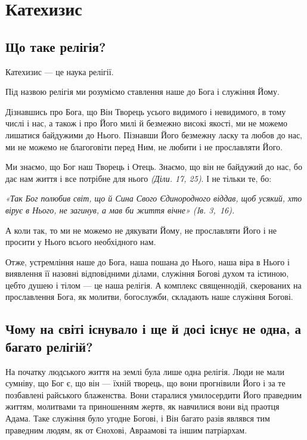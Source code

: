 \documentclass[main.tex]{subfiles}
\begin{document}
\chapter{Катехизис}
\section{Що таке релігія?}

Катехизис — це наука релігії.

Під назвою релігія ми розуміємо ставлення наше до Бога і служіння Йому.

Дізнавшись про Бога, що Він Творець усього видимого і невидимого, в тому числі і нас, а також і про Його милі й безмежно високі якості, ми не можемо лишатися байдужими до Нього. Пізнавши Його безмежну ласку та любов до нас, ми не можемо не благоговіти перед Ним, не любити і не прославляти Його.

Ми знаємо, що Бог наш Творець і Отець. Знаємо, що він не байдужий до нас, бо дає нам життя і все потрібне для нього \emph{(Діли. 17, 25)}. І не тільки те, бо:
\begin{FlushRight}
    \emph{«Так Бог полюбив світ, що й Сина Свого Єдинородного віддав, щоб усякий, хто вірує в Нього, не загинув, а мав би життя вічне» (Iв. 3,~16).}
\end{FlushRight}

А коли так, то ми не можемо не дякувати Йому, не прославляти Його і не просити у Нього всього необхідного нам.

Отже, устремління наше до Бога, наша пошана до Нього, наша віра в Нього і виявлення її назовні відповідними ділами, служіння Богові духом та істиною, цебто душею і тілом — це наша релігія. А комплекс священнодій, скерованих на прославлення Бога, як молитви, богослужби, складають наше служіння Богові.

\section{Чому на світі існувало і ще й досі існує не одна, а багато релігій?}

На початку людського життя на землі була лише одна релігія. Люди не мали сумніву, що Бог є, що він — їхній творець, що вони прогнівили Його і за те позбавлені райського блаженства. Вони старалися умилосердити Його праведним життям, молитвами та приношенням жертв, як навчилися вони від праотця Адама. Таке служіння було угодне Богові, і Він багато разів являвся тим праведним людям, як от Єнохові, Авраамові та іншим патріархам.
\end{document}
